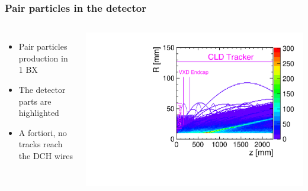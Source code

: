 \documentclass[aspectratio=169, hyperref={colorlinks=true,pdfpagelabels=false,linkcolor=black}, xcolor=dvipsnames,10pt]{beamer}
\begin{document}
\begin{frame}
	
\end{frame}


\begin{frame}
	\frametitle{Pair particles in the detector}
	
	\begin{columns}
	\begin{itemize}
	\item Pair particles production in 1 BX \vspace{0.2cm}
	\item The detector parts are highlighted \vspace{0.2cm}
	\item A fortiori, no tracks reach the DCH wires\vspace{0.2cm}
	\end{itemize}
	
		\centering
		\includegraphics[width=\textwidth]{../figures/pairs_R_Z_legend.pdf}
		
	\end{columns}
	
\end{frame}
\end{document}
